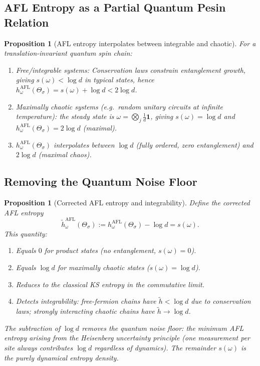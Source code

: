 \documentclass[12pt,a4paper]{article}
\newtheorem{proposition}[theorem]{Proposition}
\begin{document}
\subsection{AFL Entropy as a Partial Quantum Pesin Relation}

\begin{proposition}[AFL entropy interpolates between integrable and chaotic]
\label{prop:integrability}
For a translation-invariant quantum spin chain:
\begin{enumerate}
  \item \emph{Free/integrable systems:} Conservation laws constrain entanglement growth,
        giving $s(\omega)<\log d$ in typical states, hence
        $h_\omega^{\mathrm{AFL}}(\Theta_\sigma)=s(\omega)+\log d<2\log d$.
  \item \emph{Maximally chaotic systems} (e.g.\ random unitary circuits at
        infinite temperature): the steady state is $\omega=\bigotimes_j\frac{1}{d}\mathbf{1}$,
        giving $s(\omega)=\log d$ and $h_\omega^{\mathrm{AFL}}(\Theta_\sigma)=2\log d$ (maximal).
  \item $h_\omega^{\mathrm{AFL}}(\Theta_\sigma)$ interpolates between $\log d$
        (fully ordered, zero entanglement) and $2\log d$ (maximal chaos).
\end{enumerate}
\end{proposition}

\subsection{Removing the Quantum Noise Floor}

\begin{proposition}[Corrected AFL entropy and integrability]
\label{prop:qcorrection}
Define the \emph{corrected AFL entropy}
\begin{equation}\label{eq:corr_afl}
  \tilde{h}_\omega^{\mathrm{AFL}}(\Theta_\sigma)
  := h_\omega^{\mathrm{AFL}}(\Theta_\sigma) - \log d
  = s(\omega).
\end{equation}
This quantity:
\begin{enumerate}
  \item Equals $0$ for product states (no entanglement, $s(\omega)=0$).
  \item Equals $\log d$ for maximally chaotic states ($s(\omega)=\log d$).
  \item Reduces to the classical KS entropy in the commutative limit.
  \item Detects integrability: free-fermion chains have $\tilde{h}<\log d$ due to
        conservation laws; strongly interacting chaotic chains have $\tilde{h}\to\log d$.
\end{enumerate}
The subtraction of $\log d$ removes the \emph{quantum noise floor}: the minimum AFL
entropy arising from the Heisenberg uncertainty principle (one measurement per site
always contributes $\log d$ regardless of dynamics).  The remainder $s(\omega)$ is the
purely dynamical entropy density.
\end{proposition}
\end{document}
